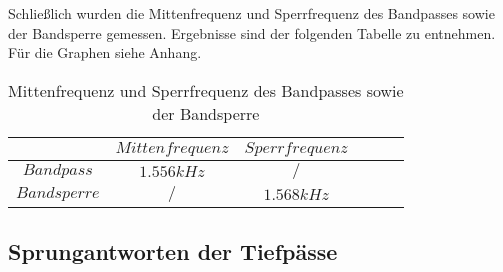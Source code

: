\noindent Schließlich wurden die Mittenfrequenz und Sperrfrequenz des Bandpasses sowie der Bandsperre gemessen. Ergebnisse sind der folgenden Tabelle zu entnehmen. Für die Graphen siehe Anhang.

\begin{table}[h]
	\centering
	\begin{tabular}{c|c|c|c|c|c}
		$ $          & $Mittenfrequenz$ & $Sperrfrequenz$  \\
		\hline
		$Bandpass$   & $1.556kHz$       & $/$         \\
		$Bandsperre$ & $/$              & $1.568kHz$  \\   
	\end{tabular}
	\caption{Mittenfrequenz und Sperrfrequenz des Bandpasses sowie der Bandsperre}
	\label{tab:grenzfrequnzen_bs_bp}
\end{table}

\newpage

\subsection{Sprungantworten der Tiefpässe}



\newpage